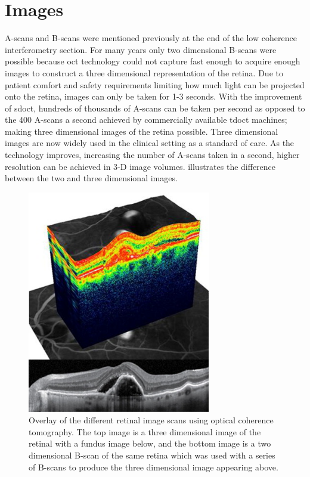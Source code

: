 \section{Images}
A-scans and B-scans were mentioned previously at the end of the low
coherence interferometry section. For many years only two dimensional B-scans 
were possible because \Gls{oct} technology could not capture fast enough to 
acquire enough images to construct a three dimensional
representation of the retina. Due to patient comfort and safety requirements limiting how
much light can be projected onto the retina, images can only be taken for 1-3 seconds. \cite{mbib_4} With the improvement of \Gls{sdoct}, hundreds of thousands
of A-scans can be taken per second as opposed to the 400 A-scans a second achieved by
commercially available \Gls{tdoct} machines; making three dimensional images of the retina
possible.\cite{mbib_4}  Three dimensional images are now widely used in the clinical
setting as a standard of care.  As the technology improves, increasing the number of
A-scans taken in a second, higher resolution can be achieved in 3-D image volumes.\cite{mbib_4}   illustrates the difference between the two 
and three dimensional images.

\begin{figure}[H]
\centering
\includegraphics[width=8cm]{figures/morgan_9}
\caption{ Overlay of the different retinal image scans using optical coherence tomography. The top image is a three dimensional image of the retinal with a fundus image below, and the bottom image is a two dimensional B-scan of the same retina which was used with a series of B-scans to produce the three dimensional image appearing above. \cite{mbib_13} }
\label{fig:m_9}
\end{figure}

